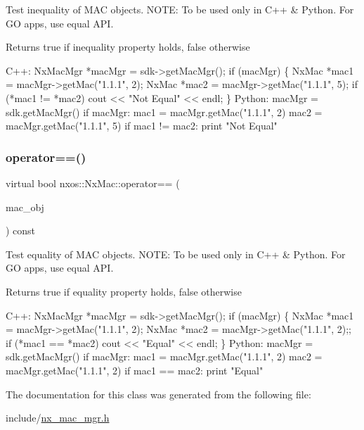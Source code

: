 Test inequality of M\+AC objects. N\+O\+TE\+: To be used only in C++ \& Python. For GO apps, use equal A\+PI.

\begin{DoxyReturn}{Returns}
true if inequality property holds, false otherwise
\end{DoxyReturn}

\begin{DoxyCode}
C++:
    NxMacMgr *macMgr = sdk->getMacMgr();
    \textcolor{keywordflow}{if} (macMgr) \{
        NxMac *mac1 = macMgr->getMac(\textcolor{stringliteral}{"1.1.1"}, 2);
        NxMac *mac2 = macMgr->getMac(\textcolor{stringliteral}{"1.1.1"}, 5);
        \textcolor{keywordflow}{if} (*mac1 != *mac2)
            cout << \textcolor{stringliteral}{"Not Equal"} << endl;
    \}
Python:
    macMgr = sdk.getMacMgr()
    \textcolor{keywordflow}{if} macMgr:
       mac1 = macMgr.getMac(\textcolor{stringliteral}{"1.1.1"}, 2)
       mac2 = macMgr.getMac(\textcolor{stringliteral}{"1.1.1"}, 5)
       \textcolor{keywordflow}{if} mac1 != mac2:
          print \textcolor{stringliteral}{"Not Equal"}
\end{DoxyCode}
 \mbox{\label{classnxos_1_1_nx_mac_ae6ebe78a6679fb460e2ed1f18c08acd0}} 
\subsubsection{\texorpdfstring{operator==()}{operator==()}}
{\footnotesize\ttfamily virtual bool nxos\+::\+Nx\+Mac\+::operator== (\begin{DoxyParamCaption}\item[{\mbox{\hyperlink{classnxos_1_1_nx_mac}{Nx\+Mac}} const \&}]{mac\+\_\+obj }\end{DoxyParamCaption}) const\hspace{0.3cm}{\ttfamily [pure virtual]}}

Test equality of M\+AC objects. N\+O\+TE\+: To be used only in C++ \& Python. For GO apps, use equal A\+PI.

\begin{DoxyReturn}{Returns}
true if equality property holds, false otherwise
\end{DoxyReturn}

\begin{DoxyCode}
C++:
    NxMacMgr *macMgr = sdk->getMacMgr();
    \textcolor{keywordflow}{if} (macMgr) \{
        NxMac *mac1 = macMgr->getMac(\textcolor{stringliteral}{"1.1.1"}, 2);
        NxMac *mac2 = macMgr->getMac(\textcolor{stringliteral}{"1.1.1"}, 2);;
        \textcolor{keywordflow}{if} (*mac1 == *mac2)
            cout << \textcolor{stringliteral}{"Equal"} << endl;
    \}
Python:
    macMgr = sdk.getMacMgr()
    \textcolor{keywordflow}{if} macMgr:
       mac1 = macMgr.getMac(\textcolor{stringliteral}{"1.1.1"}, 2)
       mac2 = macMgr.getMac(\textcolor{stringliteral}{"1.1.1"}, 2)
       \textcolor{keywordflow}{if} mac1 == mac2:
          print \textcolor{stringliteral}{"Equal"}
\end{DoxyCode}
 

The documentation for this class was generated from the following file\+:\begin{DoxyCompactItemize}
\item 
include/\mbox{\hyperlink{nx__mac__mgr_8h}{nx\+\_\+mac\+\_\+mgr.\+h}}\end{DoxyCompactItemize}
